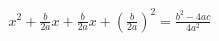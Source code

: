 \documentclass[preview]{standalone}
\begin{document}
\begin{align*}
{x}^{2} + \frac{b}{2 a} x + \frac{b}{2 a} x + {\left( \frac{b}{2 a} \right)}^{2} = \frac{{b}^{2} - 4 a c}{4 {a}^{2}}
\end{align*}
\end{document}
